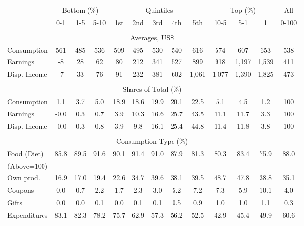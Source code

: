 \begin{tabular}{l c c c| c c c c c| c c c| c}
\toprule
&\multicolumn{3}{c|}{Bottom (\%)} & \multicolumn{5}{c|}{Quintiles} & \multicolumn{3}{c|}{Top (\%)} & All  \\
& 0-1 & 1-5 & 5-10 &  1st & 2nd & 3rd & 4th & 5th & 10-5 & 5-1 & 1 & 0-100 \\
\midrule \\
\multicolumn{13}{c}{Averages, US\$} \\
\midrule
Consumption  & 561  & 485  & 536  & 509  & 495  & 530  & 540  & 616  & 574  & 607  & 653  & 538 \\
Earnings         & -8 & 28 & 62 & 80 & 212 & 341 & 527 & 899 & 918 & 1,197 & 1,539 & 411 \\
Disp. Income & -7 & 33 & 76 & 91 & 232 & 381 & 602 & 1,061 & 1,077 & 1,390 & 1,825 & 473 \\
\midrule \\
\multicolumn{13}{c}{Shares of Total (\%)} \\
\midrule
Consumption  & 1.1   & 3.7   & 5.0   & 18.9   & 18.6   & 19.9   & 20.1   & 22.5   & 5.1   & 4.5   & 1.2   & 100 \\
Earnings         & -0.0  & 0.3  & 0.7  & 3.9  & 10.3  & 16.6  & 25.7  & 43.5  & 11.1  & 11.7  & 3.3  & 100 \\
Disp. Income & -0.0  & 0.3  & 0.8  & 3.9  & 9.8  & 16.1  & 25.4  & 44.8  & 11.4  & 11.8  & 3.8  & 100 \\
\midrule \\
\multicolumn{13}{c}{Consumption Type (\%)}  \\
\midrule
Food (Diet)  & 85.8 & 89.5 & 91.6 & 90.1 & 91.4 & 91.0 & 87.9 & 81.3 & 80.3 & 83.4 & 75.9 & 88.0 \\
(Above=100) & & & & & & & & & & & &  \\
\hspace{.3cm} Own prod.  & 16.9 & 17.0 & 19.4 & 22.6 & 34.7 & 39.6 & 38.1 & 39.5 & 48.7 & 47.8 & 38.8 & 35.1 \\
\hspace{.3cm} Coupons    & 0.0 & 0.7 & 2.2 & 1.7 & 2.3 & 3.0 & 5.2 & 7.2 & 7.3 & 5.9 & 10.1 & 4.0 \\
\hspace{.3cm} Gifts      & 0.0 & 0.0 & 0.1 & 0.0 & 0.1 & 0.1 & 0.5 & 0.9 & 1.0 & 1.0 & 1.1 & 0.3 \\
\hspace{.3cm} Expenditures  & 83.1 & 82.3 & 78.2 & 75.7 & 62.9 & 57.3 & 56.2 & 52.5 & 42.9 & 45.4 & 49.9 & 60.6 \\

\end{tabular}
